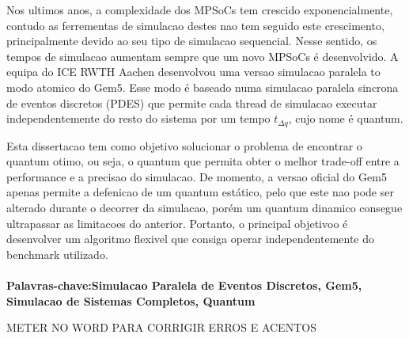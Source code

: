 

Nos ultimos anos, a complexidade dos MPSoCs tem crescido exponencialmente, contudo as ferrementas de simulacao destes nao tem seguido este 
crescimento, principalmente devido ao seu tipo de simulacao sequencial. Nesse sentido, os tempos de simulacao aumentam sempre que um novo 
MPSoCs é desenvolvido. A equipa do ICE RWTH Aachen desenvolvou uma versao simulacao paralela to modo atomico do Gem5. Esse modo é baseado 
numa simulacao paralela sincrona de eventos discretos (PDES) que permite cada thread de simulacao executar independentemente do resto do 
sistema por um tempo $t_{\Delta q}$, cujo nome é quantum.

Esta dissertacao tem como objetivo solucionar o problema de encontrar o quantum otimo, ou seja, o quantum que permita obter o melhor 
trade-off entre a performance e a precisao do simulacao. De momento, a versao oficial do Gem5 apenas permite a defenicao de um quantum 
estático, pelo que este nao pode ser alterado durante o decorrer da simulacao, porém um quantum dinamico consegue ultrapassar as limitacoes 
do anterior. Portanto, o principal objetivoo é desenvolver um algoritmo flexivel que consiga operar independentemente do benchmark utilizado. 

\paragraph{}\textbf{Palavras-chave:Simulacao Paralela de Eventos Discretos, Gem5, Simulacao de Sistemas Completos, Quantum} 

METER NO WORD PARA CORRIGIR ERROS E ACENTOS